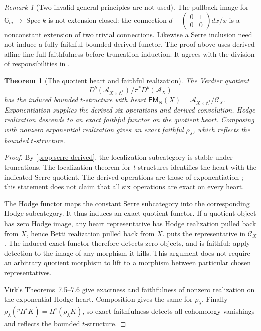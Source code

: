 \documentclass[11pt]{article}
\numberwithin{equation}{section}
\newtheorem{theorem}{Theorem}[section]
\theoremstyle{definition}
\theoremstyle{remark}
\newtheorem{remark}[remark]{Remark}
\newcommand{\A}{\mathbb A}
\newcommand{\Gm}{\mathbb G_m}
\newcommand{\Ccal}{\mathcal C}
\newcommand{\EM}{\mathsf{EM}_{\mathrm N}}
\newcommand{\Spec}{\operatorname{Spec}}
\newcommand{\pH}{{}^{p}\!H}
\begin{document}
\begin{remark}[Two invalid general principles are not used]
The pullback image for $\Gm\to\Spec k$ is not extension-closed: the
connection $d-\left(\begin{smallmatrix}0&1\\0&0\end{smallmatrix}\right)
dx/x$ is a nonconstant extension of two trivial connections. Likewise a
Serre inclusion need not induce a fully faithful bounded derived functor.
The proof above uses derived affine-line full faithfulness before
truncation induction. It agrees with the division of responsibilities in
\cite[Proposition~7.2 and \S7.3]{Virk}.
\end{remark}

\begin{theorem}[The quotient heart and faithful realization]\label{thm:quotient}
The Verdier quotient
\[
 D^b(\mathcal A_{X\times\A^1})/\pi^*D^b(\mathcal A_X)
\]
has the induced bounded $t$-structure with heart
$\EM(X)=\mathcal A_{X\times\A^1}/\Ccal_X$.
Exponentiation supplies the derived six operations and derived convolution.
Hodge realization descends to an exact faithful functor on the quotient
heart. Composing with nonzero exponential realization gives an exact
faithful $\rho_\lambda$, which reflects the bounded $t$-structure.
\end{theorem}
\begin{proof}
By \cref{prop:serre-derived}, the localization subcategory is stable under
truncations. The localization theorem for $t$-structures identifies the
heart with the indicated Serre quotient. The derived operations are those
of exponentiation \cite{GallauerPepin}; this statement does not claim
that all six operations are exact on every heart.

The Hodge functor maps the constant Serre subcategory into the corresponding
Hodge subcategory. It thus induces an exact quotient functor. If a quotient
object has zero Hodge image, any heart representative has Hodge realization
pulled back from $X$, hence Betti realization pulled back from $X$.
 puts the representative in $\Ccal_X$.
The induced exact functor therefore detects zero objects, and is faithful:
apply detection to the image of any morphism it kills. This argument does
not require an arbitrary quotient morphism to lift to a morphism between
particular chosen representatives.

Virk's Theorems~7.5--7.6 give exactness and faithfulness of nonzero
realization on the exponential Hodge heart. Composition gives the same for
$\rho_\lambda$. Finally
$\rho_\lambda(\pH^iK)=H^i(\rho_\lambda K)$, so exact faithfulness detects
all cohomology vanishings and reflects the bounded $t$-structure.
\end{proof}
\end{document}
